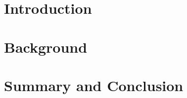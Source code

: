 








% 


\chapter{Introduction}
\label{introduction}


\chapter{Background}
\label{background}


\chapter{Summary and Conclusion}
\label{conclusion}





